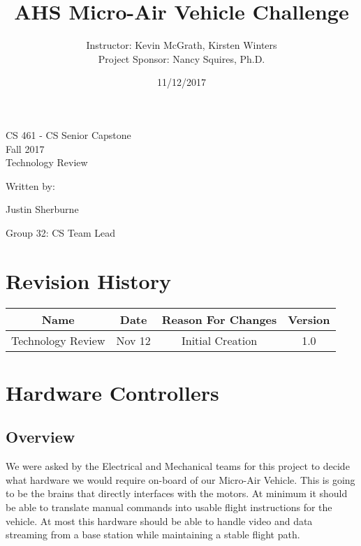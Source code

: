 \documentclass[letterpaper, 10, draftclsnofoot, onecolumn]{IEEEtran}
\date{11/12/2017}
\title{AHS Micro-Air Vehicle Challenge}
\author{ Instructor: Kevin McGrath, Kirsten Winters \\
    Project Sponsor: Nancy Squires, Ph.D.}
\def\class{CS 461 - CS Senior Capstone}
\def\term{Fall 2017}
\begin{document}
\null  %
\nointerlineskip  %
\vfill
\let\snewpage \newpage
\let\newpage \relax
\maketitle
\begin{center}
\class\\
\term\\
\huge{Technology Review}\par
\vspace{2mm}
\large{Written by:}\par
\normalsize{Justin Sherburne}\par
\normalsize{Group 32: CS Team Lead} \par
\vspace{8mm}
\end{center}


\let \newpage \snewpage
\vfill 
\break %

\tableofcontents


\section*{Revision History}

\begin{center}
    \begin{tabular}{|c|c|c|c|}
        \hline
	    Name & Date & Reason For Changes & Version\\
        \hline
	    Technology Review & Nov 12 & Initial Creation & 1.0\\
        \hline
    \end{tabular}
\end{center}



\section{Hardware Controllers}

\subsection{Overview}

We were asked by the Electrical and Mechanical teams for this 
project to decide what hardware we would require on-board of our 
Micro-Air Vehicle. This is going to be the brains that directly 
interfaces with the motors. At minimum it should be able to 
translate manual commands into usable flight instructions for the 
vehicle. At most this hardware should be able to handle video and 
data streaming from a base station while maintaining a stable 
flight path. 
\end{document}
